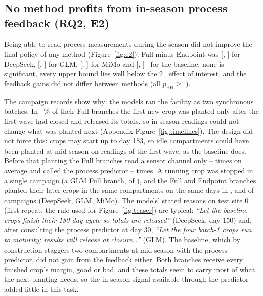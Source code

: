 \subsection{No method profits from in-season process feedback (RQ2, E2)}
\label{sec:rq2}
Being able to read process measurements during the season did not improve the final policy of any method (Figure~\ref{fig:e2}). Full minus Endpoint was  [, ] for DeepSeek,  [, ] for GLM,  [, ] for MiMo and  [, ]~\eur{} for the baseline; none is significant, every upper bound lies well below the 2~\eur{} effect of interest, and the feedback gains did not differ between methods (all $p_\text{BH}\ge$ ).

The campaign records show why: the models ran the facility as two synchronous batches. In --\% of their Full branches the first new crop was planted only after the first wave had closed and released its totals, so in-season readings could not change what was planted next (Appendix Figure~\ref{fig:timelines}). The design did not force this: crops may start up to day 183, so idle compartments could have been planted at mid-season on readings of the first wave, as the baseline does. Before that planting the Full branches read a sensor channel only -- times on average and called the process predictor -- times. A running crop was stopped in a single campaign (a GLM Full branch,  of ), and the Full and Endpoint branches planted their later crops in the same compartments on the same days in ,  and  of  campaigns (DeepSeek, GLM, MiMo). The models' stated reasons on test site 0 (first repeat, the rule used for Figure~\ref{fig:teaser}) are typical: \emph{``Let the baseline crops finish their 180-day cycle so totals are released''} (DeepSeek, day 150) and, after consulting the process predictor at day 30, \emph{``Let the four batch-1 crops run to maturity; results will release at closure\ldots''} (GLM). The baseline, which by construction staggers two compartments at mid-season with the process predictor, did not gain from the feedback either. Both branches receive every finished crop's margin, good or bad, and these totals seem to carry most of what the next planting needs, so the in-season signal available through the predictor added little in this task.

